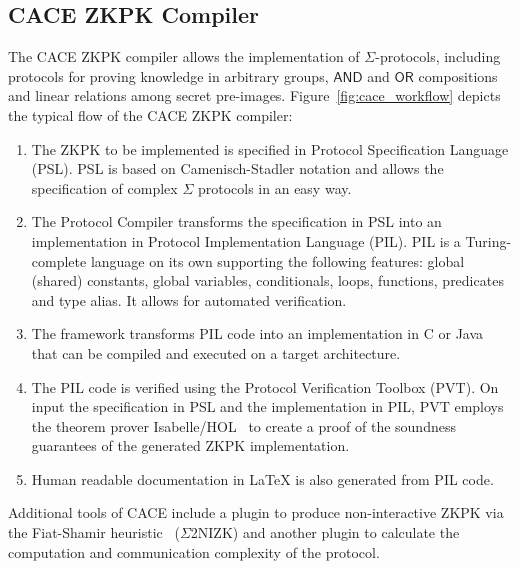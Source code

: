 \subsection{CACE ZKPK Compiler}
\label{cace}


The CACE ZKPK compiler allows the implementation of $\Sigma$-protocols, including protocols for proving knowledge in arbitrary groups, $\mathsf{AND}$ and $\mathsf{OR}$ compositions and linear relations among secret pre-images. Figure~\ref{fig:cace_workflow} depicts the typical flow of the CACE ZKPK compiler:
\begin{enumerate}
\item The ZKPK to be implemented is specified in Protocol Specification Language (PSL). PSL is based on
Camenisch-Stadler notation and allows the specification of complex $\Sigma$ protocols in an easy way.
\item The Protocol Compiler transforms the specification in PSL into an implementation in Protocol Implementation Language (PIL). PIL is a Turing-complete language on its own supporting the following features: global (shared) constants, global variables, conditionals, loops, functions, predicates and type alias. It allows for automated verification.
\item The framework transforms PIL code into an implementation in C or Java that can be compiled and executed on a target architecture.
\item The PIL code is verified using the Protocol Verification Toolbox (PVT). On input the specification in PSL and the implementation in PIL, PVT employs the theorem prover Isabelle/HOL~\cite{DBLP:books/sp/NipkowPW02} to create a proof of the soundness guarantees of the generated ZKPK implementation.
\item Human readable documentation in LaTeX is also generated from PIL code.
\end{enumerate}
Additional tools of CACE include a plugin to produce non-interactive ZKPK via the Fiat-Shamir heuristic~\cite{DBLP:conf/crypto/FiatS86} ($\Sigma$2NIZK) and another plugin to calculate the computation and communication complexity of the protocol.

